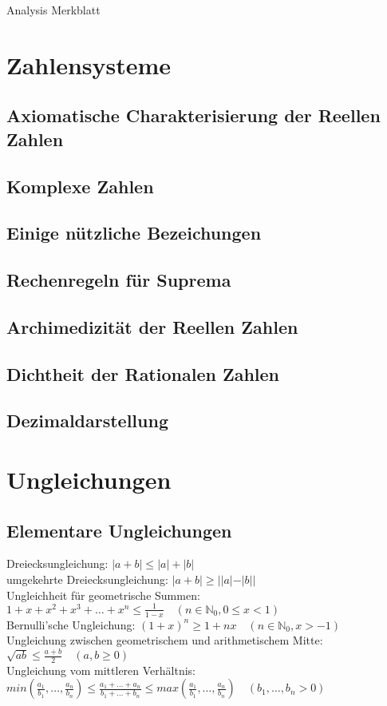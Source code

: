 \documentclass[10pt,a4paper^, twocolumn]{article}
\newcommand{\menge}{\mathbb} %
\begin{document}

\begin{center}
  {\large Analysis Merkblatt}\\
  {}
\end{center}

\section{Zahlensysteme}
\subsection{Axiomatische Charakterisierung der Reellen Zahlen}
\subsection{Komplexe Zahlen}
\subsection{Einige nützliche Bezeichungen}
\subsection{Rechenregeln für Suprema}
\subsection{Archimedizität der Reellen Zahlen}
\subsection{Dichtheit der Rationalen Zahlen}
\subsection{Dezimaldarstellung}

\section{Ungleichungen}
\subsection{Elementare Ungleichungen}
Dreiecksungleichung: $|a+b| \leq |a|+|b|$ \\
umgekehrte Dreiecksungleichung: $|a+b| \geq ||a|-|b||$ \\
Ungleichheit für geometrische Summen: $1+x+x^2+x^3+\dots+x^n \leq \frac{1}{1-x} \quad (n \in \menge{N}_0, 0 \leq x < 1)$ \\
Bernulli'sche Ungleichung: $(1+x)^n \geq 1+nx \quad (n \in \menge{N}_0, x > -1)$ \\
Ungleichung zwischen geometrischem und arithmetischem Mitte: $\sqrt{ab} \leq \frac{a+b}{2} \quad (a,b \geq 0)$ \\
Ungleichung vom mittleren Verhältnis: $min(\frac{a_1}{b_1}, \dots, \frac{a_n}{b_n}) 
					\leq \frac{a_1+\dots+a_n}{b_1+\dots+b_n} 
					\leq max(\frac{a_1}{b_1}, \dots, \frac{a_n}{b_n})
					\quad (b_1,\dots,b_n > 0)$
\end{document}
